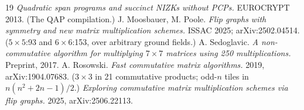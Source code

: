 \documentclass[10pt]{article}
\begin{document}
\begin{thebibliography}{19}
  \emph{Quadratic span programs and succinct NIZKs without PCPs.}
  EUROCRYPT 2013. (The QAP compilation.)
 J. Moosbauer, M. Poole. \emph{Flip graphs with
  symmetry and new matrix multiplication schemes.} ISSAC 2025;
  arXiv:2502.04514. ($5{\times}5$:93 and $6{\times}6$:153, over
  arbitrary ground fields.)
 A. Sedoglavic. \emph{A non-commutative algorithm
  for multiplying $7{\times}7$ matrices using 250
  multiplications.} Preprint, 2017.
 A. Rosowski. \emph{Fast commutative matrix
  algorithms.} 2019, arXiv:1904.07683. ($3{\times}3$ in 21
  commutative products; odd-$n$ tiles in $n(n^2+2n-1)/2$.)
 \emph{Exploring commutative matrix
  multiplication schemes via flip graphs.} 2025,
  arXiv:2506.22113.
\end{thebibliography}
\end{document}
